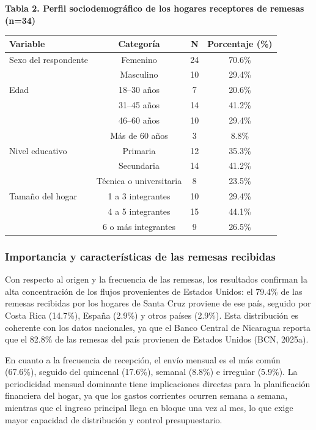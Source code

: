 \documentclass[12pt,letterpaper]{article}
\begin{document}
\textbf{Tabla 2. Perfil sociodemográfico de los hogares receptores de remesas (n=34)}

\begin{longtable}[]{@{}lccc@{}}
\toprule\noalign{}
Variable & Categoría & N & Porcentaje (\%) \\
\midrule\noalign{}
\endhead
\bottomrule\noalign{}
\endlastfoot
Sexo del respondente & Femenino & 24 & 70.6\% \\
& Masculino & 10 & 29.4\% \\
Edad & 18--30 años & 7 & 20.6\% \\
& 31--45 años & 14 & 41.2\% \\
& 46--60 años & 10 & 29.4\% \\
& Más de 60 años & 3 & 8.8\% \\
Nivel educativo & Primaria & 12 & 35.3\% \\
& Secundaria & 14 & 41.2\% \\
& Técnica o universitaria & 8 & 23.5\% \\
Tamaño del hogar & 1 a 3 integrantes & 10 & 29.4\% \\
& 4 a 5 integrantes & 15 & 44.1\% \\
& 6 o más integrantes & 9 & 26.5\% \\
\end{longtable}

\subsubsection{\texorpdfstring{\textbf{Importancia y características de las remesas recibidas}}{Importancia y características de las remesas recibidas}}\label{importancia-y-caracteruxedsticas-de-las-remesas-recibidas}

Con respecto al origen y la frecuencia de las remesas, los resultados confirman la alta concentración de los flujos provenientes de Estados Unidos: el 79.4\% de las remesas recibidas por los hogares de Santa Cruz proviene de ese país, seguido por Costa Rica (14.7\%), España (2.9\%) y otros países (2.9\%). Esta distribución es coherente con los datos nacionales, ya que el Banco Central de Nicaragua reporta que el 82.8\% de las remesas del país provienen de Estados Unidos (BCN, 2025a).

En cuanto a la frecuencia de recepción, el envío mensual es el más común (67.6\%), seguido del quincenal (17.6\%), semanal (8.8\%) e irregular (5.9\%). La periodicidad mensual dominante tiene implicaciones directas para la planificación financiera del hogar, ya que los gastos corrientes ocurren semana a semana, mientras que el ingreso principal llega en bloque una vez al mes, lo que exige mayor capacidad de distribución y control presupuestario.
\end{document}
